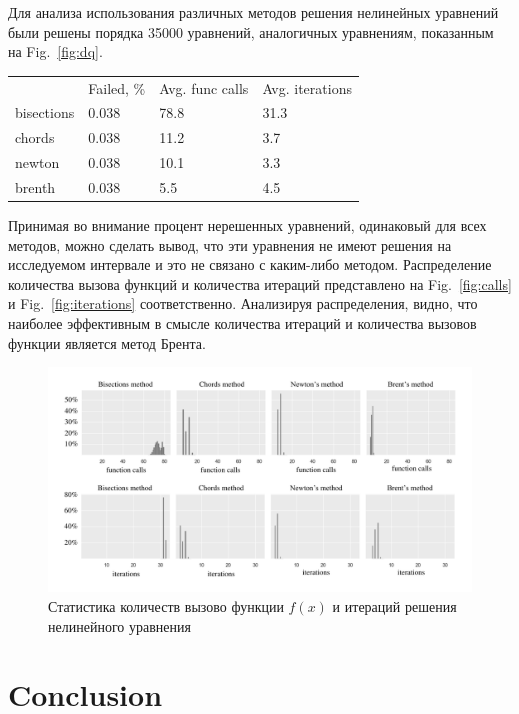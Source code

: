 \documentclass[
11pt,%
tightenlines,%
twoside,%
onecolumn,%
nofloats,%
nobibnotes,%
nofootinbib,%
superscriptaddress,%
noshowpacs,%
centertags]%
{revtex4}
\begin{document}
Для анализа использования различных методов решения нелинейных уравнений были решены порядка 35000 уравнений, аналогичных уравнениям, показанным на Fig.~\ref{fig:dq}.
\newpage

\begin{table}[ht!]
\begin{tabular}{llll}
           & Failed, \% & Avg. func calls & Avg. iterations \\
bisections & 0.038      & 78.8            & 31.3            \\
chords     & 0.038      & 11.2            & 3.7             \\
newton     & 0.038      & 10.1            & 3.3             \\
brenth     & 0.038      & 5.5             & 4.5            
\end{tabular}
\end{table}

Принимая во внимание процент нерешенных уравнений, одинаковый для всех методов, можно сделать вывод, что эти уравнения не имеют решения на исследуемом интервале и это не связано с каким-либо методом. Распределение количества вызова функций и количества итераций представлено на Fig.~\ref{fig:calls} и Fig.~\ref{fig:iterations} соответственно. Анализируя распределения, видно, что наиболее эффективным в смысле количества итераций и количества вызовов функции является метод Брента.

\begin{figure}[h!]
\setcaptionmargin{5mm}
\onelinecaptionstrue
\includegraphics[width=1\textwidth]{pics/stat.pdf}
\caption{Статистика количеств вызово функции $f(x)$ и итераций решения нелинейного уравнения}\label{fig:stat}
\end{figure}

\section{Conclusion}
\end{document}
